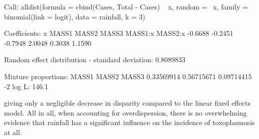 \documentclass[a4paper]{article}
\begin{document}
\begin{landscape}
\begin{Schunk}
\begin{Soutput}
Call:  alldist(formula = cbind(Cases, Total - Cases) ~ x, random = ~x,      family = binomial(link = logit), data = rainfall, k = 3) 

Coefficients:
      x    MASS1    MASS2    MASS3  MASS1:x  MASS2:x  
-0.6688  -0.2451  -0.7948   2.0048   0.3038   1.1590  

Random effect distribution - standard deviation:	   0.8089833 

Mixture proportions:
     MASS1       MASS2       MASS3  
0.33569914  0.56715671  0.09714415  
-2 log L:	    146.1 
\end{Soutput}
\end{Schunk}
 giving only a negligible decrease in disparity compared to the linear fixed effects model.  All in all, when accounting for overdispersion, 
 there is no  overwhelming evidence that rainfall has a significant influence on the incidence of toxoplasmosis at all.
 

\end{landscape}
\end{document}
